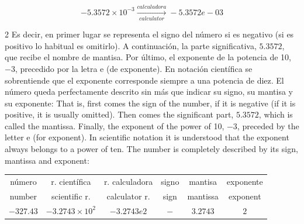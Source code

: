 \begin{equation*}
-5.3572\times 10^{-3}  \xrightarrow[calculator]{calculadora}  -5.3572e-03
\end{equation*}

\begin{paracol}{2}
Es decir, en primer lugar se representa el signo del número si es negativo (si es positivo lo habitual es omitirlo). A continuación, la parte significativa, $5.3572$, que recibe el nombre de mantisa. Por último, el exponente de la potencia de 10, $-3$, precedido por la letra e (de exponente). En notación científica se sobrentiende que el exponente corresponde siempre a una potencia de diez. El número queda perfectamente descrito sin más que indicar su signo, su mantisa y su exponente:
\switchcolumn
That is, first comes the sign of the number, if it is negative (if it is positive, it is usually omitted). Then comes the significant part, $5.3572$, which is called the mantissa. Finally, the exponent of the power of 10, $-3$, preceded by the letter e (for exponent). In scientific notation it is understood that the exponent always belongs to a power of ten. The number is completely described by its sign, mantissa and exponent:
\end{paracol}
\begin{table}[H]
\centering
\begin{tabular}{|c||c||c||c|c|c|}
\hline
número&r. científica&r. calculadora&signo&mantisa&exponente\\
number&scientific r.&calculator r.&sign&mantissa&exponent\\
\hline
$-327.43$&$-3.2743\times 10^2$&$-3.2743e2$&$-$&$3.2743$&$2$\\
\hline
\end{tabular}
\end{table}

